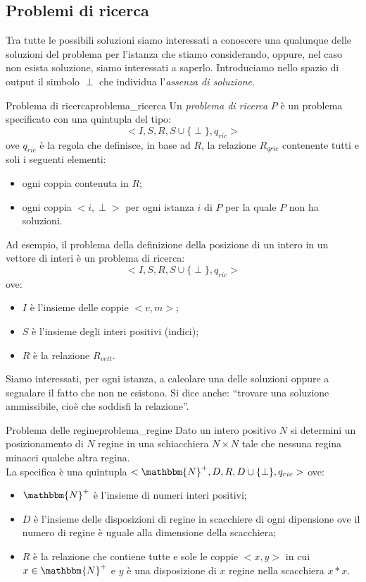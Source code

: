 \documentclass[12pt]{report}
\newcounter{definition}
\newcommand{\nmu}{}
\begin{document}
   	\subsection{Problemi di ricerca}
   	Tra tutte le possibili soluzioni siamo interessati a conoscere una qualunque delle soluzioni del problema per l'istanza che stiamo considerando, oppure, nel caso non esista soluzione, siamo interessati a saperlo. Introduciamo nello spazio di output il simbolo $\perp$ che individua l'\textit{assenza di soluzione}.
   	\begin{definition}{\nmu Problema di ricerca}{problema_ricerca}
   		Un \textit{problema di ricerca} $P$ è un problema specificato con una quintupla del tipo:
   		\[
   		<I, S, R, S \cup \{\perp\}, q_{ric}>
   		\]
   		ove $q_{ric}$ è la regola che definisce, in base ad $R$, la relazione $R_{qric}$ contenente tutti e soli i seguenti elementi:
   		\begin{itemize}
   			\item ogni coppia contenuta in $R$;
   			\item ogni coppia $<i, \perp>$ per ogni istanza $i$ di $P$ per la quale $P$ non ha soluzioni.
   		\end{itemize}
   	\end{definition}
   	Ad esempio, il problema della definizione della posizione di un intero in un vettore  di interi è un problema di ricerca:
   	\[
   	<I, S, R, S \cup \{\perp\}, q_{ric}>
   	\]
   	ove:
   	\begin{itemize}
   		\item $I$ è l'insieme delle coppie $<v, m>$;
   		\item $S$ è l'insieme degli interi positivi (indici);
   		\item $R$ è la relazione $R_{vett}$.
   	\end{itemize}
   	Siamo interessati, per ogni istanza, a calcolare una delle soluzioni oppure a segnalare il fatto che non ne esistono. Si dice anche: ``trovare una soluzione ammissibile, cioè che soddisfi la relazione''.
   	\begin{example}{\nmu Problema delle regine}{problema_regine}
   		Dato un intero positivo $N$ si determini un posizionamento di $N$ regine in una schiacchiera $N \times N$ tale che nessuna regina minacci qualche altra regina. \\
   		La specifica è una quintupla $<\mathbbm{N}^+, D, R, D \cup \{\perp\}, q_{ric}>$ ove:
   		\begin{itemize}
   			\item $\mathbbm{N}^+$ è l'insieme di numeri interi positivi;
   			\item $D$ è l'insieme delle disposizioni di regine in scacchiere di ogni dipensione ove il numero di regine è uguale alla dimensione della scacchiera;
   			\item $R$ è la relazione che contiene tutte e sole le coppie $<x, y>$ in cui $x \in \mathbbm{N}^+$ e $y$ è una disposizione di $x$ regine nella scacchiera $x * x$.
   		\end{itemize}
   	\end{example}
\end{document}
